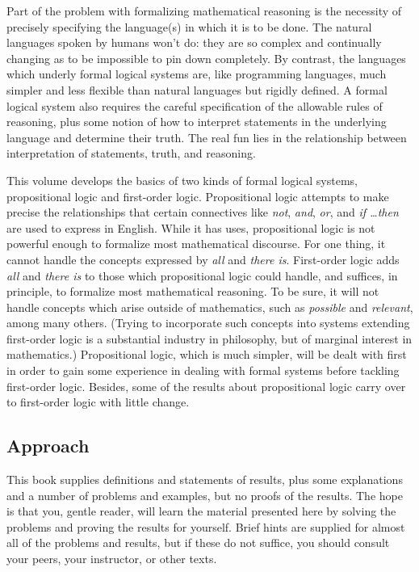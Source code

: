 \documentclass[12pt]{amsbook}
\theoremstyle{plain}
\theoremstyle{definition}
\theoremstyle{remark}
\begin{document}
Part of the problem with formalizing mathematical reasoning is the necessity of precisely specifying the language(s) in which it is to be done.  The natural languages spoken by humans won't do:  they are so complex and continually changing as to be impossible to pin down completely.  By contrast, the languages which underly formal logical systems are,  like programming languages,  much simpler and less flexible than natural languages but rigidly defined.  A formal logical system also requires the careful specification of the allowable rules of reasoning,  plus some notion of how to interpret statements in the underlying language and determine their truth.  The real fun lies in the relationship between interpretation of statements,  truth,  and reasoning.  

This volume develops the basics of two kinds of formal logical systems,  propositional logic and first-order logic.  Propositional logic   attempts to make precise the relationships that certain connectives like {\em not\/},   {\em and\/},  {\em or\/},   and {\em if \dots then\/}  are  used to express in English.  While it has uses,  propositional logic is not powerful enough to formalize most mathematical discourse.  For one thing,  it cannot handle the concepts expressed by {\em all\/} and {\em there is\/}.  First-order logic   adds {\em all\/} and {\em there is\/} to those which propositional logic could handle,  and suffices,  in principle,  to formalize most mathematical reasoning.  To be sure,  it will not handle concepts which arise outside of mathematics,  such as {\em possible\/} and {\em relevant\/},  among many others.  (Trying to incorporate such concepts into systems extending first-order logic is a substantial industry in philosophy,  but of marginal interest in mathematics.)  Propositional logic,  which is much simpler,  will be dealt with first in order to gain some experience in dealing with formal systems before tackling first-order logic.  Besides,  some of the results about propositional logic carry over to first-order logic with little change.

\subsection*{Approach}
This book supplies definitions and statements of results,  plus some explanations and a number of problems and examples,  but no proofs of the results.  The hope is that you,  gentle reader,  will learn the material presented here by solving the problems and proving the results for yourself.  Brief hints are supplied for almost all of the problems and results,  but if these do not suffice,  you should consult your peers,  your instructor,  or other texts.
\end{document}
